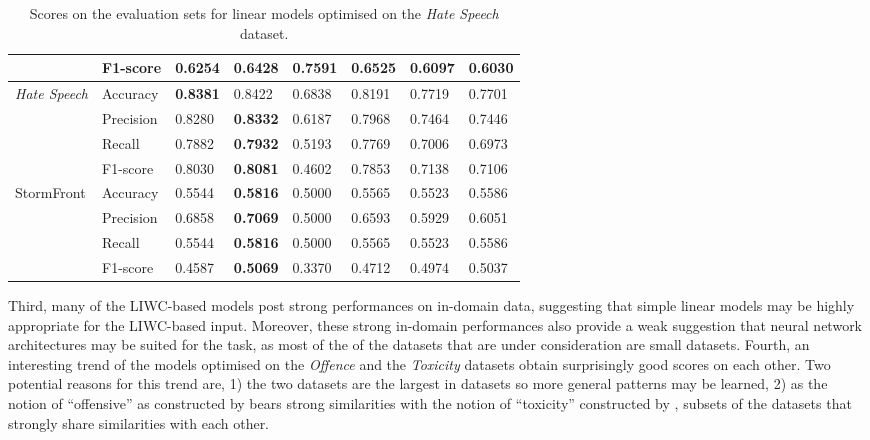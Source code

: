 \begin{table}[]
\begin{minipage}{0.42\paperheight}
{\begin{tabular}{ll|ll|ll|ll}
                                           & F1-score  & 0.6254       & 0.6428           & \bf{0.7591} & 0.6525        & 0.6097      & 0.6030      \\ \hline  
    \multirow{4}{*}{\textit{Hate Speech}}  & Accuracy  & \bf{0.8381}  & 0.8422           & 0.6838      & 0.8191        & 0.7719      & 0.7701      \\  
                                           & Precision & 0.8280       & \bf{0.8332}      & 0.6187      & 0.7968        & 0.7464      & 0.7446      \\  
                                           & Recall    & 0.7882       & \bf{0.7932}      & 0.5193      & 0.7769        & 0.7006      & 0.6973      \\  
                                           & F1-score  & 0.8030       & \bf{0.8081}      & 0.4602      & 0.7853        & 0.7138      & 0.7106      \\ \hline  
    \multirow{4}{*}{StormFront}            & Accuracy  & 0.5544       & \bf{0.5816}      & 0.5000      & 0.5565        & 0.5523      & 0.5586      \\  
                                           & Precision & 0.6858       & \bf{0.7069}      & 0.5000      & 0.6593        & 0.5929      & 0.6051      \\  
                                           & Recall    & 0.5544       & \bf{0.5816}      & 0.5000      & 0.5565        & 0.5523      & 0.5586      \\  
                                           & F1-score  & 0.4587       & \bf{0.5069}      & 0.3370      & 0.4712        & 0.4974      & 0.5037  
    \end{tabular}%
    }  
    \caption{Scores on the evaluation sets for linear models optimised on the \textit{Hate Speech} dataset.}  
    \label{tab:linear_hatespeech_baselines}  
\end{minipage}  
\end{table}  
  
Third, many of the LIWC-based models post strong performances on in-domain data, suggesting that simple linear models may be highly appropriate for the LIWC-based input.  
Moreover, these strong in-domain performances also provide a weak suggestion that neural network architectures may be  suited for the task, as most of the of the datasets that are under consideration are small datasets.  
Fourth, an interesting trend of the models optimised on the \textit{Offence} and the \textit{Toxicity} datasets obtain surprisingly good scores on each other.  
Two potential reasons for this trend are, 1) the two datasets are the largest in datasets so more general patterns may be learned, 2) as the notion of ``offensive'' as constructed by \citet{Davidson:2017} bears strong similarities with the notion of ``toxicity'' constructed by \citet{Wulczyn:2017},  subsets of the datasets that strongly share similarities with each other.  
  
